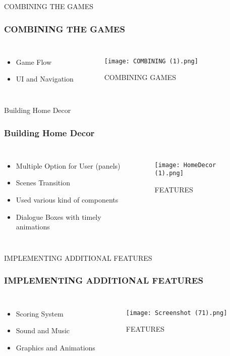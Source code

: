 \documentclass[10pt]{beamer}
\begin{document}
\begin{frame}{COMBINING THE GAMES}
    \frametitle{COMBINING THE GAMES}
    \begin{columns}
    
    \begin{itemize}
    
    
            \item Game Flow
            \item UI and Navigation
            \end{itemize}
        \begin{figure}
        \texttt{[image: COMBINING (1).png]}
        \caption{COMBINING GAMES}
        \end{figure}
     \end{columns}
\end{frame}
\begin{frame}{Building Home Decor}
    \frametitle{Building Home Decor}
    \begin{columns}
    
    \begin{itemize}
    
    
            \item Multiple Option for User (panels)
            \item Scenes Transition
            \item Used various kind of components
            \item Dialogue Boxes with timely animations
            \end{itemize}
        \begin{figure}
        \texttt{[image: HomeDecor (1).png]}
        \caption{FEATURES}
        \end{figure}
     \end{columns}
\end{frame}
\begin{frame}{IMPLEMENTING ADDITIONAL FEATURES}
    \frametitle{IMPLEMENTING ADDITIONAL FEATURES}
    \begin{columns}
    
    \begin{itemize}
    
    
            \item Scoring System
            \item Sound and Music
            \item Graphics and Animations

            \end{itemize}
        \begin{figure}
        \texttt{[image: Screenshot (71).png]}
        \caption{FEATURES}
        \end{figure}
     \end{columns}
\end{frame}
\end{document}
